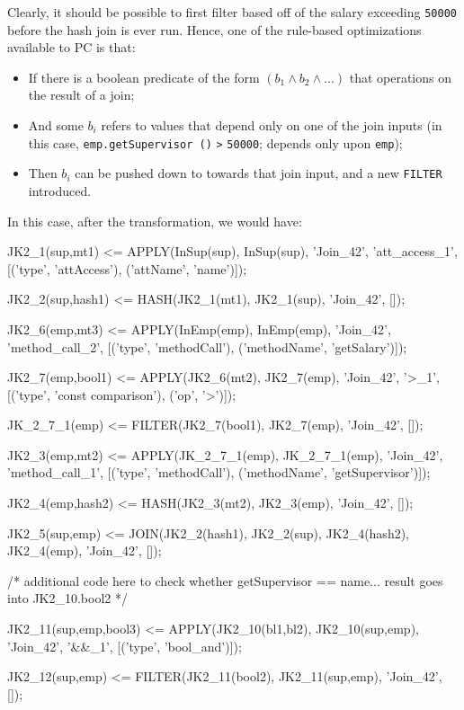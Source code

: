 Clearly, it should be possible to first filter based off of the salary exceeding \texttt{50000} before the hash join is ever run.  Hence, one of
the rule-based optimizations available to PC is that:

\begin{itemize}

\vspace{-5 pt}
\item If there is a boolean predicate of the form $(b_1 \wedge b_2 \wedge ...)$ that operations
on the result of a join;

\vspace{-5 pt}
\item And some $b_i$ refers to values that depend only on one of the join inputs (in this case, \texttt{emp.getSupervisor ()}
\texttt{>} \texttt{50000};
depends only upon \texttt{emp});

\vspace{-5 pt}
\item Then $b_i$ can be pushed down to towards that join input, and a new \texttt{FILTER} introduced.
\end{itemize}

\noindent In this case, after the transformation, we would have:

\begin{codesmall}
JK2_1(sup,mt1) <= APPLY(InSup(sup), InSup(sup), 'Join_42', 'att_access_1', 
  [('type', 'attAccess'), ('attName', 'name')]);

JK2_2(sup,hash1) <= HASH(JK2_1(mt1), JK2_1(sup), 'Join_42', []);

JK2_6(emp,mt3) <= APPLY(InEmp(emp), InEmp(emp), 'Join_42', 'method_call_2', 
  [('type', 'methodCall'), ('methodName', 'getSalary')]);

JK2_7(emp,bool1) <= APPLY(JK2_6(mt2), JK2_7(emp), 'Join_42', '>_1', 
  [('type', 'const comparison'), ('op', '>')]);

JK_2_7_1(emp) <= FILTER(JK2_7(bool1), JK2_7(emp), 'Join_42', []);

JK2_3(emp,mt2) <= APPLY(JK_2_7_1(emp), JK_2_7_1(emp), 'Join_42', 'method_call_1', 
  [('type', 'methodCall'), ('methodName', 'getSupervisor')]);

JK2_4(emp,hash2) <= HASH(JK2_3(mt2), JK2_3(emp), 'Join_42', []);

JK2_5(sup,emp) <= JOIN(JK2_2(hash1), JK2_2(sup), JK2_4(hash2), 
  JK2_4(emp), 'Join_42', []);

/* additional code here to check whether getSupervisor == name... 
   result goes into JK2_10.bool2 */

JK2_11(sup,emp,bool3) <= APPLY(JK2_10(bl1,bl2), JK2_10(sup,emp), 'Join_42', '&&_1', 
  [('type', 'bool_and')]);

JK2_12(sup,emp) <= FILTER(JK2_11(bool2), JK2_11(sup,emp), 'Join_42', []);
\end{codesmall}

